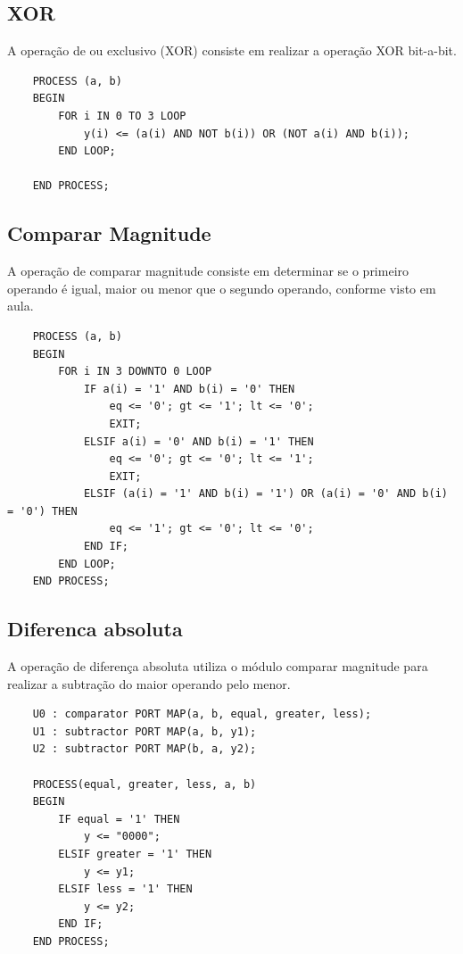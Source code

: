 \documentclass[12pt]{article}
\begin{document}
\subsection*{XOR}

A operação de ou exclusivo (XOR) consiste em realizar a operação XOR bit-a-bit.

\begin{verbatim}
    PROCESS (a, b)
    BEGIN
        FOR i IN 0 TO 3 LOOP
            y(i) <= (a(i) AND NOT b(i)) OR (NOT a(i) AND b(i));
        END LOOP;

    END PROCESS;
\end{verbatim}

\subsection*{Comparar Magnitude}

A operação de comparar magnitude consiste em determinar se o primeiro operando é igual, maior ou menor que o segundo operando, conforme visto em aula.

\begin{verbatim}
    PROCESS (a, b)
    BEGIN
        FOR i IN 3 DOWNTO 0 LOOP
            IF a(i) = '1' AND b(i) = '0' THEN
                eq <= '0'; gt <= '1'; lt <= '0';
                EXIT;
            ELSIF a(i) = '0' AND b(i) = '1' THEN
                eq <= '0'; gt <= '0'; lt <= '1';
                EXIT;
            ELSIF (a(i) = '1' AND b(i) = '1') OR (a(i) = '0' AND b(i) = '0') THEN
                eq <= '1'; gt <= '0'; lt <= '0';
            END IF;
        END LOOP;
    END PROCESS;
\end{verbatim}

\subsection*{Diferenca absoluta}

A operação de diferença absoluta utiliza o módulo comparar magnitude para realizar a subtração do maior operando pelo menor.

\begin{verbatim}
    U0 : comparator PORT MAP(a, b, equal, greater, less);
    U1 : subtractor PORT MAP(a, b, y1);
    U2 : subtractor PORT MAP(b, a, y2);

    PROCESS(equal, greater, less, a, b)
    BEGIN
        IF equal = '1' THEN
            y <= "0000";
        ELSIF greater = '1' THEN
            y <= y1;
        ELSIF less = '1' THEN
            y <= y2;
        END IF;
    END PROCESS;
\end{verbatim}
\end{document}
